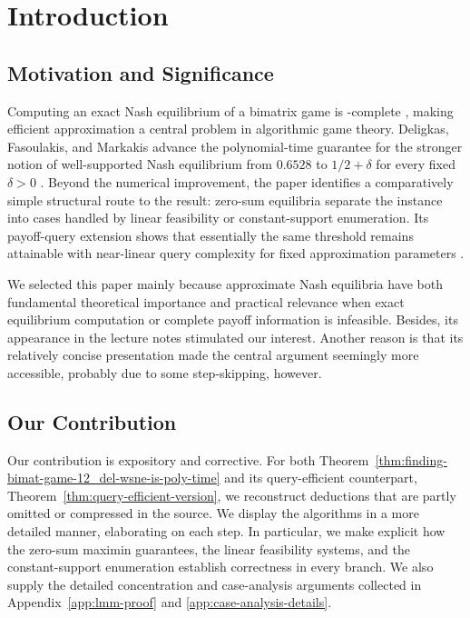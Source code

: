 \section{Introduction}

\subsection{Motivation and Significance}

Computing an exact Nash equilibrium of a bimatrix game is \PPAD-complete \cite{DGP09}, making efficient approximation a central problem in algorithmic game theory. Deligkas, Fasoulakis, and Markakis advance the polynomial-time guarantee for the stronger notion of well-supported Nash equilibrium from $0.6528$ to $1/2+\delta$ for every fixed $\delta>0$ \cite{12WSNE}. Beyond the numerical improvement, the paper identifies a comparatively simple structural route to the result: zero-sum equilibria separate the instance into cases handled by linear feasibility or constant-support enumeration. Its payoff-query extension shows that essentially the same threshold remains attainable with near-linear query complexity for fixed approximation parameters \cite[Section~4]{12WSNE}.

We selected this paper mainly because approximate Nash equilibria have both fundamental theoretical importance and practical relevance when exact equilibrium computation or complete payoff information is infeasible. Besides, its appearance in the lecture notes stimulated our interest. Another reason is that its relatively concise presentation made the central argument seemingly more accessible, probably due to some step-skipping, however.

\subsection{Our Contribution}

Our contribution is expository and corrective. For both Theorem~\ref{thm:finding-bimat-game-12_del-wsne-is-poly-time} and its query-efficient counterpart, Theorem~\ref{thm:query-efficient-version}, we reconstruct deductions that are partly omitted or compressed in the source. We display the algorithms in a more detailed manner, elaborating on each step. In particular, we make explicit how the zero-sum maximin guarantees, the linear feasibility systems, and the constant-support enumeration establish correctness in every branch. We also supply the detailed concentration and case-analysis arguments collected in Appendix~\ref{app:lmm-proof} and \ref{app:case-analysis-details}.

